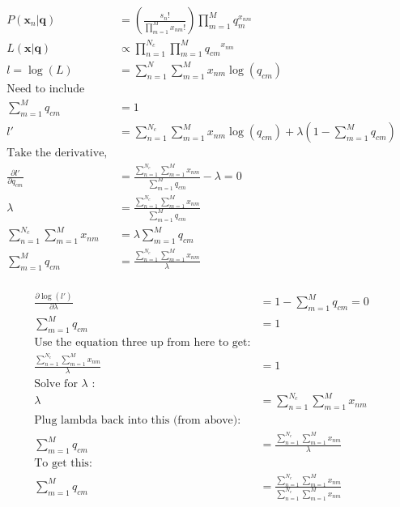 \documentclass[10pt]{article}
\begin{document}
\begin{itemize}
\begin{eqnarray*}
\begin{aligned}
P(\mathbf{x}_n | \mathbf{q}) &= \left( \frac{s_n !}{\prod_{m=1}^M x_{nm} !} \right)
\prod_{m=1}^M q_{m}^{x_{nm}}
\\
L(\mathbf{x}| \mathbf{q}) &\propto \prod_{n=1}^{N_c} \prod_{m=1}^M {q_{cm}}^{x_{nm}}
\\
l = \log(L) &= \sum_{n=1}^N \sum_{m=1}^M x_{nm} \log(q_{cm})
\\
\text{Need to include constraint, Lagrange multiplier}
\\
\sum_{m=1}^M q_{cm} &= 1
\\
l' &= \sum_{n=1}^{N_c} \sum_{m=1}^M x_{nm} \log(q_{cm}) + \lambda(1 - \sum_{m=1}^M q_{cm})
\\
\text{Take the derivative, set to 0}
\\
\frac{\partial l'}{\partial q_{cm}} &= 
\frac{ \sum_{n=1}^{N_c} \sum_{m=1}^M x_{nm} }{ \sum_{m=1}^M q_{cm}} - \lambda = 0
\\
\lambda &= \frac{ \sum_{n=1}^{N_c} \sum_{m=1}^M x_{nm} }{\sum_{m=1}^M q_{cm}}
\\
\sum_{n=1}^{N_c} \sum_{m=1}^M x_{nm} &= \lambda \sum_{m=1}^M q_{cm}
\\
\sum_{m=1}^M q_{cm} &= \frac{ \sum_{n=1}^{N_c} \sum_{m=1}^M x_{nm} }{ \lambda }
\end{aligned}
\end{eqnarray*}

\begin{eqnarray*}
\begin{aligned}
\frac{\partial \log(l')}{\partial \lambda} &= 
1 - \sum_{m=1}^M q_{cm} = 0
\\
\sum_{m=1}^M q_{cm} &= 1 
\\
\text{Use the equation three up from here to get:}
\\
\frac{ \sum_{n=1}^{N_c} \sum_{m=1}^M x_{nm} }{ \lambda } &= 1
\\
\text{Solve for $\lambda$ :}
\\
\lambda &= \sum_{n=1}^{N_c} \sum_{m=1}^M x_{nm}
\\
\text{Plug lambda back into this (from above):}
\\
\sum_{m=1}^M q_{cm} &= \frac{ \sum_{n=1}^{N_c} \sum_{m=1}^M x_{nm} }{ \lambda }
\\
\text{To get this:}
\\
\sum_{m=1}^M q_{cm} &= \frac{ \sum_{n=1}^{N_c} \sum_{m=1}^M x_{nm} }{ \sum_{n=1}^{N_c} \sum_{m=1}^M x_{nm} }
\end{aligned}
\end{eqnarray*}


\end{itemize}
\end{document}
